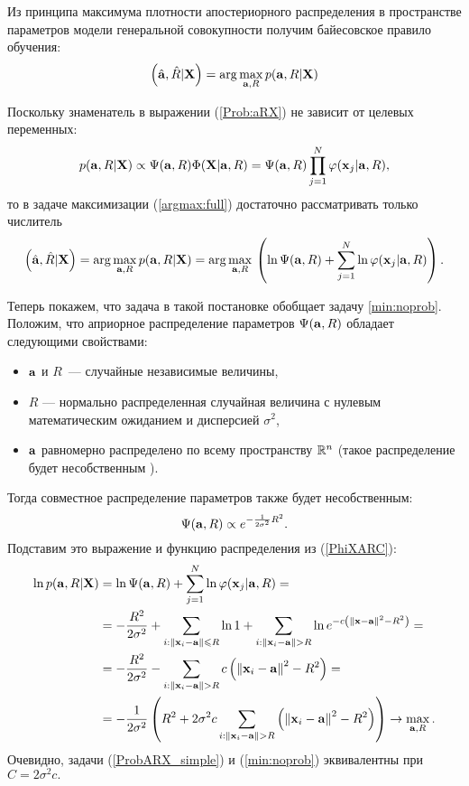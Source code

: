 Из принципа максимума плотности апостериорного распределения в пространстве параметров модели генеральной совокупности получим байесовское правило обучения:
\begin{equation}
	\label{argmax:full}
	\left(\hat{\boldsymbol{\mathbf{a}}},\hat R|\boldsymbol{\mathbf{X}}\right) = \arg\underset{\boldsymbol{\mathbf{a}},R}\max\, p(\boldsymbol{\mathbf{a}},R|\boldsymbol{\mathbf{X}})
\end{equation}

Поскольку знаменатель в выражении (\ref{Prob:aRX}) не зависит от целевых переменных: 
$$p(\boldsymbol{\mathbf{a}},R|\boldsymbol{\mathbf{X}}) 
	\propto \Psi(\boldsymbol{\mathbf{a}},R) \Phi(\boldsymbol{\mathbf{X}}|\boldsymbol{\mathbf{a}},R) 
	=  \Psi(\boldsymbol{\mathbf{a}},R) \prod_{j=1}^N \varphi(\boldsymbol{\mathbf{x}}_j|\boldsymbol{\mathbf{a}},R),$$
то в задаче максимизации (\ref{argmax:full}) достаточно рассматривать только числитель
$$\left(\hat{\boldsymbol{\mathbf{a}}},\hat R|\boldsymbol{\mathbf{X}}\right)
	= \arg\underset{\boldsymbol{\mathbf{a}},R}\max\, p(\boldsymbol{\mathbf{a}},R|\boldsymbol{\mathbf{X}}) 
	= \arg\underset{\boldsymbol{\mathbf{a}},R}\max\, \left(\ln\Psi(\boldsymbol{\mathbf{a}},R) + \sum_{j=1}^N\ln\varphi(\boldsymbol{\mathbf{x}}_j|\boldsymbol{\mathbf{a}},R)\right). $$

Теперь покажем, что задача в такой постановке обобщает задачу \ref{min:noprob}. 
Положим, что априорное распределение параметров $\Psi(\boldsymbol{\mathbf{a}},R)$ обладает следующими свойствами:
\begin{itemize}
 	\item $\boldsymbol{\mathbf{a}}$ и $R$~--- случайные независимые величины,
 	\item $R$ --- нормально распределенная случайная величина с нулевым математическим ожиданием и дисперсией $\sigma^2$,
 	\item $\boldsymbol{\mathbf{a}}$ равномерно распределено по всему пространству $\mathbb{R}^n$ (такое распределение будет несобственным \cite{Groot1974}).
 \end{itemize} 
 Тогда совместное распределение параметров также будет несобственным: 
 $$\Psi(\boldsymbol{\mathbf{a}},R)\propto e^{-\frac1{2\sigma^2}R^2}.$$
 Подставим это выражение и функцию распределения из (\ref{PhiXARC}):
 \begin{align}
 	\label{ProbARX_simple}
 	\ln p(\boldsymbol{\mathbf{a}},R|\boldsymbol{\mathbf{X}}) 
 		&=	\ln\Psi(\boldsymbol{\mathbf{a}},R) + \sum_{j=1}^N\ln\varphi(\boldsymbol{\mathbf{x}}_j|\boldsymbol{\mathbf{a}},R) =\notag \\
 		&= 	-\frac{R^2}{2\sigma^2} + \sum_{i: \left\|{\boldsymbol{\mathbf{x}}_i - \boldsymbol{\mathbf{a}}}\right\| \leqslant R} \ln 1 
 			+ \sum_{i: \left\|{\boldsymbol{\mathbf{x}}_i - \boldsymbol{\mathbf{a}}}\right\| > R} \ln e^{-c \left(\left\|{\boldsymbol{\mathbf{x}}-\boldsymbol{\mathbf{a}}}\right\|^2-R^2\right)}  = \notag \\
 		&= -\frac{R^2}{2\sigma^2} - \sum_{i: \left\|{\boldsymbol{\mathbf{x}}_i - \boldsymbol{\mathbf{a}}}\right\| > R} c\left(\left\|{\boldsymbol{\mathbf{x}}_i - \boldsymbol{\mathbf{a}}}\right\|^2 - R^2\right) = \notag \\
 		&= -\frac1{2\sigma^2}\left(R^2 + 2\sigma^2 c\sum_{i: \left\|{\boldsymbol{\mathbf{x}}_i - \boldsymbol{\mathbf{a}}}\right\| > R} \left(\left\|{\boldsymbol{\mathbf{x}}_i - \boldsymbol{\mathbf{a}}}\right\|^2 -R^2\right)\right) \to \max_{\boldsymbol{\mathbf{a}}, R}.
 \end{align}
 Очевидно, задачи (\ref{ProbARX_simple}) и (\ref{min:noprob}) эквивалентны при $C = 2\sigma^2 c.$

 